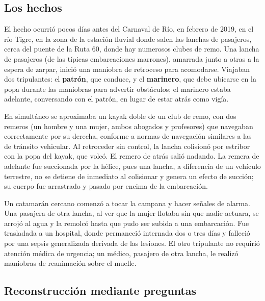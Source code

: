 \documentclass[12pt,oneside]{book}
\begin{document}
\subsection{Los hechos}

El hecho ocurrió pocos días antes del Carnaval de Río, en febrero de 2019, en el río Tigre, en la zona de la estación fluvial donde salen las lanchas de pasajeros, cerca del puente de la Ruta 60, donde hay numerosos clubes de remo. Una lancha de pasajeros (de las típicas embarcaciones marrones), amarrada junto a otras a la espera de zarpar, inició una maniobra de retroceso para acomodarse. Viajaban dos tripulantes: el \textbf{patrón}, que conduce, y el \textbf{marinero}, que debe ubicarse en la popa durante las maniobras para advertir obstáculos; el marinero estaba adelante, conversando con el patrón, en lugar de estar atrás como vigía.

En simultáneo se aproximaba un kayak doble de un club de remo, con dos remeros (un hombre y una mujer, ambos abogados y profesores) que navegaban correctamente por su derecha, conforme a normas de navegación similares a las de tránsito vehicular. Al retroceder sin control, la lancha colisionó por estribor con la popa del kayak, que volcó. El remero de atrás salió nadando. La remera de adelante fue succionada por la hélice, pues una lancha, a diferencia de un vehículo terrestre, no se detiene de inmediato al colisionar y genera un efecto de succión; su cuerpo fue arrastrado y pasado por encima de la embarcación.

Un catamarán cercano comenzó a tocar la campana y hacer señales de alarma. Una pasajera de otra lancha, al ver que la mujer flotaba sin que nadie actuara, se arrojó al agua y la remolcó hasta que pudo ser subida a una embarcación. Fue trasladada a un hospital, donde permaneció internada dos o tres días y falleció por una sepsis generalizada derivada de las lesiones. El otro tripulante no requirió atención médica de urgencia; un médico, pasajero de otra lancha, le realizó maniobras de reanimación sobre el muelle.

\subsection{Reconstrucción mediante preguntas}
\end{document}
